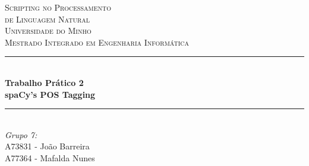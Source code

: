 \documentclass[12pt]{article}
\begin{document}
\sloppy

\begin{titlepage}

\newcommand{\HRule}{\rule{\linewidth}{0.5mm}} %

\center %

\vspace{0.5cm}
 

\textsc{\LARGE Scripting no Processamento}\\[0.3cm]
\textsc{\LARGE de Linguagem Natural}\\[1.1cm] %
\textsc{\Large Universidade do Minho}\\[0.5cm] %
\textsc{\large Mestrado Integrado em Engenharia Informática}\\[0.5cm] %

\vspace{0.8cm}
\HRule \\[0.6cm]
{ \huge \bfseries Trabalho Prático 2}\\[0.4cm] %
{ \Large \bfseries spaCy's POS Tagging}\\[0.4cm] %
\HRule \\[1.0cm]
 

\Large \emph{Grupo 7:}\\
A73831 - João Barreira\\
A77364 - Mafalda Nunes\\[1.3cm]



\end{titlepage}
\end{document}
